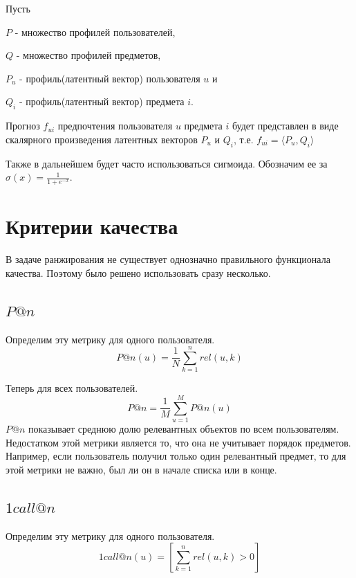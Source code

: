 \documentclass[a4paper,12pt]{article}
\begin{document}
Пусть  

$P$ - множество профилей пользователей, 

$Q$ - множество профилей предметов,

$P_u$ - профиль(латентный вектор) пользователя $u$ и

$Q_i$ - профиль(латентный вектор) предмета $i$.

Прогноз $f_{ui}$ предпочтения пользователя $u$ предмета $i$ будет представлен в виде скалярного произведения латентных векторов $P_u$ и $Q_i$, т.е. $f_{ui} = \langle P_u, Q_i \rangle$

Также в дальнейшем будет часто использоваться сигмоида. Обозначим ее за $\sigma(x) = \frac{1}{1 + e^{-x}}$. 
%

\section{Критерии качества}
В задаче ранжирования не существует однозначно правильного функционала качества. Поэтому было решено использовать сразу несколько.

\subsection{$P@n$}
	Определим эту метрику для одного пользователя.
	\begin{equation*}
		P@n(u) = \frac{1}{N}\sum_{k = 1}^n rel(u, k)
	\end{equation*}
	
	Теперь для всех пользователей.
	\begin{equation*}
		P@n = \frac{1}{M}\sum_{u = 1}^M P@n(u)
	\end{equation*}
	$P@n$ показывает среднюю долю релевантных объектов по всем пользователям.  Недостатком этой метрики является то, что она не учитывает порядок предметов. Например,  если пользователь получил только один релевантный предмет, то для этой метрики не важно, был ли он в начале списка или в конце. 
\subsection{$1call@n$}
	Определим эту метрику для одного пользователя.
	\begin{equation*}
		1call@n(u) = [\sum_{k = 1}^n rel(u, k) > 0]
	\end{equation*}
	
\end{document}
